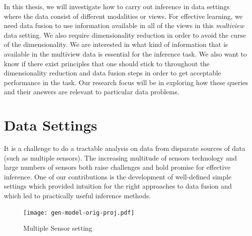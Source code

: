\documentclass[12pt,oneside,final]{thesis}
\begin{document}
In this thesis, we will investigate how to carry out inference in  data  settings where the data consist of different modalities or views. For effective learning, we need data fusion to use information available in all of the views in this \emph{multiview} data setting. We also require dimensionality reduction in order to avoid the curse of the dimensionality. We are interested in what kind of information that is available in the multiview data  is essential for the inference task. We also want to know if there exist principles that one should stick to  throughout the dimensionality reduction and data fusion steps in order to get acceptable performance in the task. Our research focus will be in exploring how these  queries and their answers are  relevant to  particular data problems.

\section{Data Settings}


 It is a challenge  to do a tractable analysis on data from disparate sources of data (such as multiple sensors). The increasing multitude  of sensors technology and large numbers of sensors both raise challenges and hold promise for effective inference. One of our contributions is the development of  well-defined simple settings which provided intuition for the right approaches to data fusion and which led to practically useful inference methods.
 
 
\begin{figure}
\centering
\texttt{[image: gen-model-orig-proj.pdf]}
\caption{Multiple Sensor setting \label{fig:gen-model}}
\end{figure}
\end{document}
